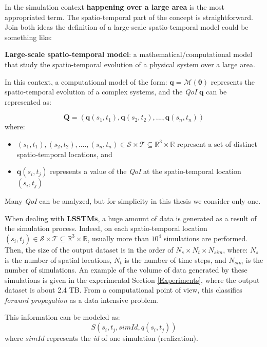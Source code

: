 In the simulation context \textbf{happening over a large area} is the most appropriated term. The spatio-temporal part of the concept is straightforward. Join both ideas the definition of a large-scale spatio-temporal model could be something like:

\begin{defn}
\textbf{Large-scale spatio-temporal model}: a mathematical/computational model that study the spatio-temporal evolution of a physical system over a large area.
\end{defn}

In this context, a computational model of the form: $\bm{q}=\mathcal{M}(\bm{\theta})$ represents the spatio-temporal evolution of a complex systems, and the \textit{QoI} $\bm{q}$ can be represented as:  

\begin{equation} \label{eq:spatio_temporal}
\mathbf{Q} = (\mathbf{q}(s_{1},t_{1}),\mathbf{q}(s_{2},t_{2}),...,\mathbf{q}(s_{n},t_{n}))  
\end{equation}
where:
\begin{itemize}
\item $(s_{1},t_{1}),(s_{2},t_{2}),....,(s_{n},t_{n}) \in \mathcal{S} \times \mathcal{T}\subseteq\mathbb{R}^{3}\times\mathbb{R}$ represent a set of distinct spatio-temporal locations, and
\item $\mathbf{q}(s_{i},t_{j})$ represents a value of the \textit{QoI} at the spatio-temporal location $(s_{i},t_{j})$
\end{itemize}
Many \textit{QoI} can be analyzed, but for simplicity in this thesis we consider only one.

When dealing with \textbf{LSSTMs}, a huge amount of data is generated as a result of the simulation process. Indeed, on each spatio-temporal location $(s_{i},t_{j}) \in \mathcal{S} \times \mathcal{T}\subseteq\mathbb{R}^{3}\times\mathbb{R}$, usually more than $10^4$ simulations are performed. Then, the size of the output dataset is in the order of $N_{s}\times N_{t}\times N_{sim}$, where: $N_{s}$ is the number of spatial locations, $N_{t}$ is the number of time steps, and $N_{sim}$ is the number of simulations.  An example of the volume of data generated by these simulations is given in the experimental Section \ref{Experiments}, where the output dataset is about 2.4 TB. From a computational point of view, this classifies \textit{forward propagation} as a data intensive problem.

This information can be modeled as:
\begin{equation}\label{eq:data_base_structure}
S(s_{i},t_{j},simId,q(s_{i},t_{j}))
\end{equation}
where $simId$ represents the \textit{id} of one simulation (realization).

